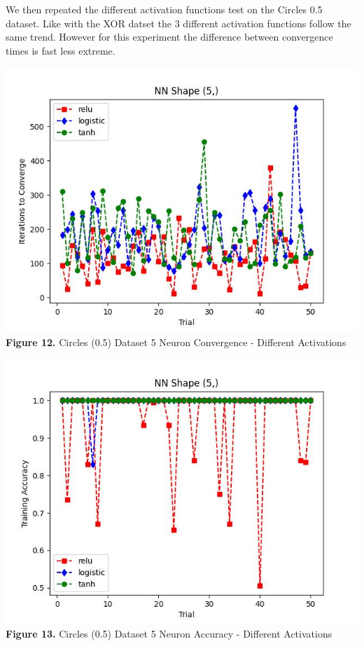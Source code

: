 \documentclass[11pt]{article}
\begin{document}
We then repeated the different activation functions test on the Circles
0.5 dataset. Like with the XOR datset the 3 different activation
functions follow the same trend. However for this experiment the
difference between convergence times is fast less extreme.

\includegraphics{figures/cir05_5_activation_conv.jpg}\\
\textbf{Figure 12.} Circles (0.5) Dataset 5 Neuron Convergence -
Different Activations

\includegraphics{figures/cir05_5_activation_acc.jpg}\\
\textbf{Figure 13.} Circles (0.5) Dataset 5 Neuron Accuracy - Different
Activations
\end{document}
